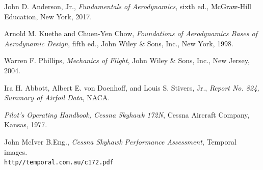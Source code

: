 \documentclass[letterpaper,12pt]{article}
\begin{document}
\begin{thebibliography}{6}
John D. Anderson, Jr.,
\textit{Fundamentals of Aerodynamics}, sixth ed.,
McGraw-Hill Education, New York, 2017.

Arnold M. Kuethe and Chuen-Yen Chow,
\textit{Foundations of Aerodynamics Bases of Aerodynamic Design}, fifth ed.,
John Wiley \& Sons, Inc., New York, 1998.

Warren F. Phillips,
\textit{Mechanics of Flight},
John Wiley \& Sons, Inc., New Jersey, 2004.

Ira H. Abbott, Albert E. von Doenhoff, and Louis S. Stivers, Jr.,
\textit{Report No. 824, Summary of Airfoil Data},
NACA.

\textit{Pilot's Operating Handbook, Cessna Skyhawk 172N},
Cessna Aircraft Company, Kansas, 1977.

John McIver B.Eng.,
\textit{Cessna Skyhawk Performance Assessment}, Temporal images.
\\\texttt{http//temporal.com.au/c172.pdf}
\end{thebibliography}
\end{document}
